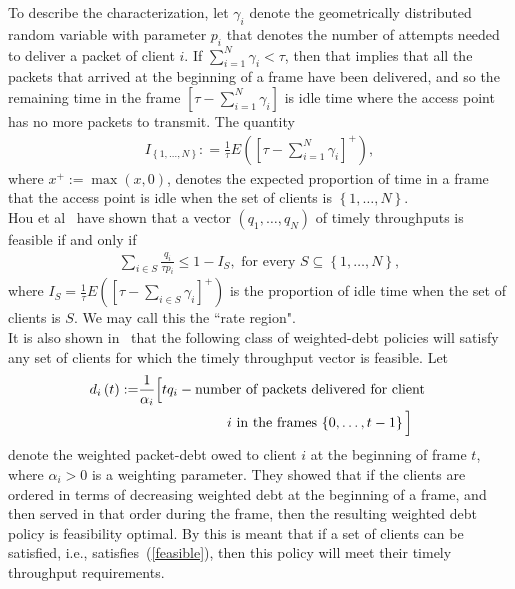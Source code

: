 \documentclass[letterpaper, 10 pt, conference]{ieeeconf}
\begin{document}
To describe the characterization, let $\gamma_{i}$ denote the geometrically distributed random variable with parameter $p_{i}$ that denotes the number of attempts needed to deliver a packet of client $i$. If $\sum_{i=1}^{N} \gamma_{i}<\tau$, then that implies that all the packets that arrived at the beginning of a frame have been delivered, and so the remaining time in the frame $\left[\tau-\sum_{i=1}^{N}\gamma_{i}\right]$ is idle time where the access point has no more packets to transmit. The quantity 
\begin{align}\label{idle}
I_{\left\{1,\ldots,N\right\}} : = \frac{1}{\tau} E\left(\left[\tau-\sum_{i=1}^{N} \gamma_{i}\right]^{+} \right),
\end{align} 
where $x^{+} := \max\left(x,0\right)$, denotes the expected proportion of time in a frame that the access point is idle when the set of clients is $\left\{1,\ldots,N\right\}$.\\
Hou et al~\cite{c3} have shown that a vector $\left(q_{1},\ldots,q_{N}\right)$ of timely throughputs is feasible if and only if
\begin{align}\label{feasible}
\sum_{i\in S}\frac{q_{i}}{\tau p_{i}}\leq  1 - I_{S}, \mbox{ for every } S\subseteq \left\{1,\ldots,N\right\},
\end{align}
where $I_{S} = \frac{1}{\tau} E\left(\left[\tau-\sum_{i\in S} \gamma_{i}\right]^{+} \right)$ is the proportion of idle time when the set of clients is $S$. We may call this the ``rate region".\\
It is also shown in~\cite{c3} that the following class of weighted-debt policies will satisfy any set of clients for which the timely throughput vector is feasible. Let
\begin{align}
d_{i}\left(t\right) :=& \frac{1}{\alpha_{i}}\Big[tq_{i} -\mbox{number of packets delivered for client  }\notag\\
&\qquad \qquad\qquad \mbox{ $i$ in the frames $\left\{0,\ldots,t-1\right\} \Big]$}
\end{align}  
denote the weighted packet-debt owed to client $i$ at the beginning of frame $t$, where $\alpha_{i}>0$ is a weighting parameter. They showed that if the clients are ordered in terms of decreasing weighted debt at the beginning of a frame, and then served in that order during the frame, then the resulting weighted debt policy is feasibility optimal. By this is meant that if a set of clients can be satisfied, i.e., satisfies~(\ref{feasible}), then this policy will meet their timely throughput requirements.\\
\end{document}
